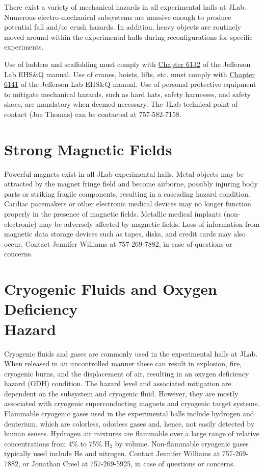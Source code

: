 \documentclass[12pt]{report}
\begin{document}
There exist a variety of mechanical hazards in all experimental halls at JLab. Numerous 
electro-mechanical subsystems are massive enough to produce potential fall and/or crush 
hazards.  In addition, heavy objects are routinely moved around within the experimental 
halls during reconfigurations for specific experiments. 

Use of ladders and scaffolding must comply with 
\href{http://www.jlab.org/ehs/ehsmanual/manual/6132.html}{Chapter 6132} of the Jefferson 
Lab EHS\&Q manual. Use of cranes, hoists, lifts, etc. must comply with
\href{http://www.jlab.org/ehs/ehsmanual/manual/6141.html}{Chapter 6141} of the Jefferson
Lab EHS\&Q manual. Use of personal protective equipment to mitigate mechanical hazards, 
such as hard hats, safety harnesses, and safety shoes, are mandatory when deemed necessary.
The JLab technical point-of-contact (Joe Thomas) can be contacted at 757-582-7158.

\section{Strong Magnetic Fields}

Powerful magnets exist in all JLab experimental halls. Metal objects may be attracted 
by the magnet fringe field and become airborne, possibly injuring body parts or striking 
fragile components, resulting in a cascading hazard condition. Cardiac pacemakers or other 
electronic medical devices may no longer function properly in the presence of magnetic 
fields. Metallic medical implants (non-electronic) may be adversely affected by magnetic 
fields. Loss of information from magnetic data storage devices such as tapes, disks, and 
credit cards may also occur. Contact Jennifer Williams at 757-269-7882, in case of questions
or concerns.

\section{Cryogenic Fluids and Oxygen Deficiency \\Hazard}

Cryogenic fluids and gases are commonly used in the experimental halls at JLab. When 
released in an uncontrolled manner these can result in explosion, fire, cryogenic burns, 
and the displacement of air, resulting in an oxygen deficiency hazard (ODH) condition. 
The hazard level and associated mitigation are dependent on the subsystem and cryogenic 
fluid. However, they are mostly associated with cryogenic superconducting magnets and 
cryogenic target systems. Flammable cryogenic gases used in the experimental halls 
include hydrogen and deuterium, which are colorless, odorless gases and, hence, not easily 
detected by human senses. Hydrogen air mixtures are flammable over a large range of relative 
concentrations from 4\% to 75\% H$_2$ by volume. Non-flammable cryogenic gases typically 
used include He and nitrogen. Contact Jennifer Williams at 757-269-7882, or Jonathan Creel
at 757-269-5925, in case of questions or concerns.
\end{document}
